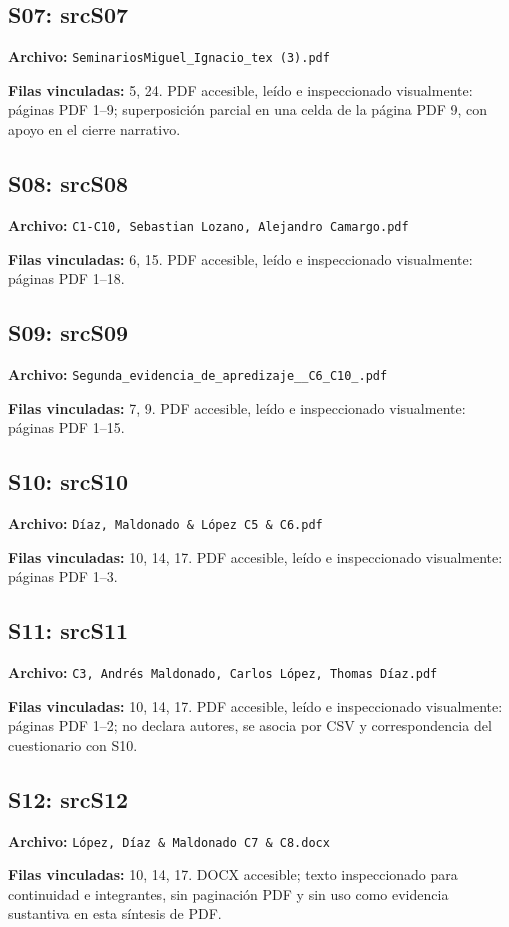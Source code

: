 \documentclass[11pt,a4paper]{article}
\begin{document}
\subsection*{\hypertarget{fuente-S07}{S07}: \csname srcS07\endcsname}
{\small\textbf{Archivo:} \texttt{SeminariosMiguel\_\allowbreak{}Ignacio\_\allowbreak{}tex (3).pdf}

\textbf{Filas vinculadas:} 5, 24. PDF accesible, leído e inspeccionado visualmente: páginas PDF 1--9; superposición parcial en una celda de la página PDF 9, con apoyo en el cierre narrativo.}
\subsection*{\hypertarget{fuente-S08}{S08}: \csname srcS08\endcsname}
{\small\textbf{Archivo:} \texttt{C1-C10, Sebastian Lozano, Alejandro Camargo.pdf}

\textbf{Filas vinculadas:} 6, 15. PDF accesible, leído e inspeccionado visualmente: páginas PDF 1--18.}
\subsection*{\hypertarget{fuente-S09}{S09}: \csname srcS09\endcsname}
{\small\textbf{Archivo:} \texttt{Segunda\_\allowbreak{}evidencia\_\allowbreak{}de\_\allowbreak{}apredizaje\_\allowbreak{}\_\allowbreak{}C6\_\allowbreak{}C10\_\allowbreak{}.pdf}

\textbf{Filas vinculadas:} 7, 9. PDF accesible, leído e inspeccionado visualmente: páginas PDF 1--15.}
\subsection*{\hypertarget{fuente-S10}{S10}: \csname srcS10\endcsname}
{\small\textbf{Archivo:} \texttt{Díaz, Maldonado \& López C5 \& C6.pdf}

\textbf{Filas vinculadas:} 10, 14, 17. PDF accesible, leído e inspeccionado visualmente: páginas PDF 1--3.}
\subsection*{\hypertarget{fuente-S11}{S11}: \csname srcS11\endcsname}
{\small\textbf{Archivo:} \texttt{C3, Andrés Maldonado, Carlos López, Thomas Díaz.pdf}

\textbf{Filas vinculadas:} 10, 14, 17. PDF accesible, leído e inspeccionado visualmente: páginas PDF 1--2; no declara autores, se asocia por CSV y correspondencia del cuestionario con S10.}
\subsection*{\hypertarget{fuente-S12}{S12}: \csname srcS12\endcsname}
{\small\textbf{Archivo:} \texttt{López, Díaz \& Maldonado C7 \& C8.docx}

\textbf{Filas vinculadas:} 10, 14, 17. DOCX accesible; texto inspeccionado para continuidad e integrantes, sin paginación PDF y sin uso como evidencia sustantiva en esta síntesis de PDF.}
\end{document}
